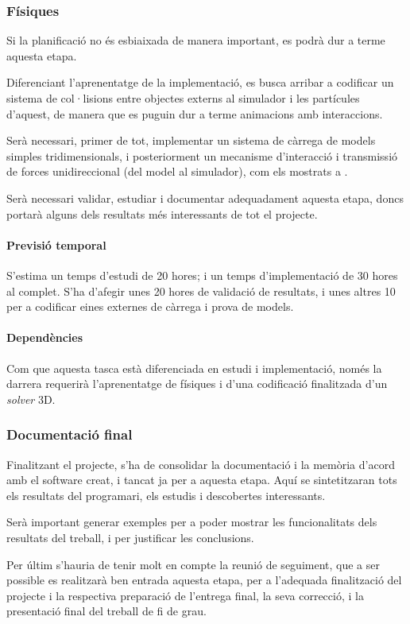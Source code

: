 \documentclass[a4paper]{report}
\begin{document}
	\subsubsection{Físiques}
	Si la planificació no és esbiaixada de manera important, es podrà dur a terme aquesta etapa. \par
	Diferenciant l'aprenentatge de la implementació, es busca arribar a codificar un sistema de col·lisions entre objectes externs al simulador i les partícules d'aquest, de manera que es puguin dur a terme animacions amb interaccions. \par
	Serà necessari, primer de tot, implementar un sistema de càrrega de models simples tridimensionals, i posteriorment un mecanisme d'interacció i transmissió de forces unidireccional (del model al simulador), com els mostrats a \cite{Ericson2005}. \par
	Serà necessari validar, estudiar i documentar adequadament aquesta etapa, doncs portarà alguns dels resultats més interessants de tot el projecte.
	\paragraph{\quad Previsió temporal} S'estima un temps d'estudi de 20 hores; i un temps d'implementació de 30 hores al complet. S'ha d'afegir unes 20 hores de validació de resultats, i unes altres 10 per a codificar eines externes de càrrega i prova de models.
	\paragraph{\quad Dependències} Com que aquesta tasca està diferenciada en estudi i implementació, només la darrera requerirà l'aprenentatge de físiques i d'una codificació finalitzada d'un \textit{solver} 3D.
	
	\subsubsection{Documentació final}
	Finalitzant el projecte, s'ha de consolidar la documentació i la memòria d'acord amb el software creat, i tancat ja per a aquesta etapa. Aquí se sintetitzaran tots els resultats del programari, els estudis i descobertes interessants. \par
	Serà important generar exemples per a poder mostrar les funcionalitats dels resultats del treball, i per justificar les conclusions.\par
	Per últim s'hauria de tenir molt en compte la reunió de seguiment, que a ser possible es realitzarà ben entrada aquesta etapa, per a l'adequada finalització del projecte i la respectiva preparació de l'entrega final, la seva correcció, i la presentació final del treball de fi de grau.
\end{document}

